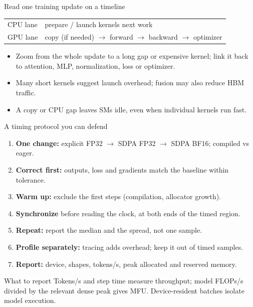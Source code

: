 \documentclass[handout]{beamer}
\begin{document}
\begin{frame}{Read one training update on a timeline}
  \small
  \begin{tabular}{@{}p{.20\linewidth}p{.66\linewidth}@{}}
    \toprule
    CPU lane & prepare / launch kernels \hfill next work \\
    GPU lane & copy (if needed) $\to$ forward $\to$ backward $\to$ optimizer \\
    \bottomrule
  \end{tabular}
  \vspace{6pt}
  \begin{itemize}
    \item Zoom from the whole update to a long gap or expensive kernel; link it back to attention, MLP, normalization, loss or optimizer.
    \item Many short kernels suggest launch overhead; fusion may also reduce HBM traffic.
    \item A copy or CPU gap leaves SMs idle, even when individual kernels run fast.
  \end{itemize}
\end{frame}

\begin{frame}{A timing protocol you can defend}
  \small
  \begin{enumerate}
      \setlength{\itemsep}{2pt}
    \item \textbf{One change:} explicit FP32 $\to$ SDPA FP32 $\to$ SDPA BF16; compiled vs eager.
    \item \textbf{Correct first:} outputs, loss and gradients match the baseline within tolerance.
    \item \textbf{Warm up:} exclude the first steps (compilation, allocator growth).
    \item \textbf{Synchronize} before reading the clock, at both ends of the timed region.
    \item \textbf{Repeat:} report the median and the spread, not one sample.
    \item \textbf{Profile separately:} tracing adds overhead; keep it out of timed samples.
    \item \textbf{Report:} device, shapes, tokens/s, peak allocated and reserved memory.
  \end{enumerate}
  \begin{block}{What to report}
    Tokens/s and step time measure throughput; model FLOPs/s divided by the relevant dense peak gives MFU. Device-resident batches isolate model execution.
  \end{block}
\end{frame}
\end{document}
